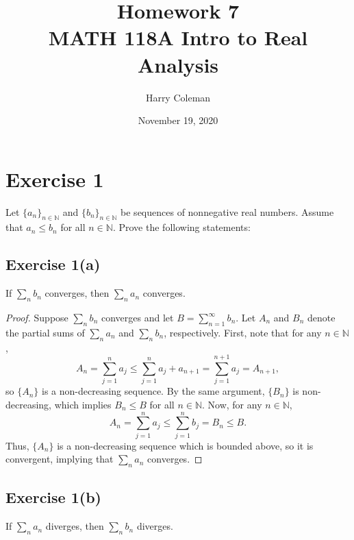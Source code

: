 \documentclass[12pt]{article}
\newenvironment{problem}
    {\begin{lrbox}{\mybox}\begin{minipage}{0.98\textwidth}}
    {\end{minipage}\end{lrbox}\framebox[\textwidth]{\usebox{\mybox}}}
\newcommand{\ds}{\displaystyle}
\newcommand{\N}{\mathbb{N}} %
\newcommand{\<}{\left\langle} %
\renewcommand{\>}{\right\rangle} %
\begin{document}
 
\title{Homework 7\\
    \large MATH 118A Intro to Real Analysis
}
\author{Harry Coleman}
\date{November 19, 2020}
\maketitle

\section*{Exercise 1}
\begin{problem}
    Let $\{a_n\}_{n\in\N}$ and $\{b_n\}_{n\in\N}$ be sequences of nonnegative real numbers. Assume that $a_n \le b_n$ for all $n\in\N$. Prove the following statements:
\end{problem}

\subsection*{Exercise 1(a)}
\begin{problem}
    If $\sum_n b_n$ converges, then $\sum_n a_n$ converges.
\end{problem}

\begin{proof}
    Suppose $\sum_n b_n$ converges and let $B = \ds\sum_{n=1}^\infty b_n$. Let $A_n$ and $B_n$ denote the partial sums of $\sum_n a_n$ and $\sum_n b_n$, respectively. First, note that for any $n\in\N$,
    \[A_n = \sum_{j=1}^n a_j \leq \sum_{j=1}^n a_j + a_{n+1} = \sum_{j=1}^{n+1}a_j = A_{n+1},\]
    so $\{A_n\}$ is a non-decreasing sequence. By the same argument, $\{B_n\}$ is non-decreasing, which implies $B_n\leq B$ for all $n\in\N$. Now, for any $n\in\N$,
    \[A_n = \sum_{j=1}^n a_j \leq \sum_{j=1}^n b_j = B_n \leq B.\]
    Thus, $\{A_n\}$ is a non-decreasing sequence which is bounded above, so it is convergent, implying that $\sum_n a_n$ converges.
    
\end{proof}

\newpage
\subsection*{Exercise 1(b)}
\begin{problem}
    If $\sum_n a_n$ diverges, then $\sum_n b_n$ diverges.
\end{problem}
\medskip
\end{document}
